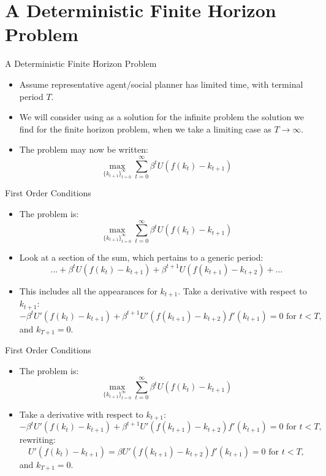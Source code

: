 \documentclass{beamer}
\begin{document}
\section{A Deterministic Finite Horizon Problem}
\begin{frame}{A Deterministic Finite Horizon Problem}
    \begin{itemize}
        \item Assume representative agent/social planner has limited time, with terminal period $T$. 
        \item We will consider using as a solution for the infinite problem the solution we find for the finite horizon problem, when we take a limiting case as $T\to \infty$.
        \item The problem may now be written:
        \[\max_{\{ k_{t+1}\}_{t=0}^\infty} \sum_{t=0}^\infty \beta^t U\left(f(k_t)-k_{t+1}\right)
    \]
        
    \end{itemize}
\end{frame}
\begin{frame}{First Order Conditions}
    \begin{itemize}
       
        \item The problem is:
        \[\max_{\{ k_{t+1}\}_{t=0}^\infty} \sum_{t=0}^\infty \beta^t U\left(f(k_t)-k_{t+1}\right)
    \]
    \item Look at a section of the sum, which pertains to a generic period: 
    \[... +  \beta^t U\left(f(k_t)-k_{t+1}\right)+ \beta^{t+1} U\left(f(k_{t+1})-k_{t+2}\right)+...
    \]
        \item This includes all the appearances for $k_{t+1}$. Take a derivative with respect to $k_{t+1}$:
        \[ - \beta^t U'\left(f(k_t)-k_{t+1}\right)+ \beta^{t+1} U'\left(f(k_{t+1})-k_{t+2}\right)f'(k_{t+1})=0 \text{ for } t<T, 
        \]
        and $k_{T+1}=0$.
    \end{itemize}
\end{frame}
\begin{frame}{First Order Conditions}
    \begin{itemize}
       
        \item The problem is:
        \[\max_{\{ k_{t+1}\}_{t=0}^\infty} \sum_{t=0}^\infty \beta^t U\left(f(k_t)-k_{t+1}\right)
    \]
 
        \item  Take a derivative with respect to $k_{t+1}$:
        \[ - \beta^t U'\left(f(k_t)-k_{t+1}\right)+ \beta^{t+1} U'\left(f(k_{t+1})-k_{t+2}\right)f'(k_{t+1})=0 \text{ for } t<T, 
        \]
        rewriting:
        \[  U'\left(f(k_t)-k_{t+1}\right)= \beta U'\left(f(k_{t+1})-k_{t+2}\right)f'(k_{t+1})=0 \text{ for } t<T, 
        \]
         and $k_{T+1}=0$.
    \end{itemize}
\end{frame}
\end{document}
